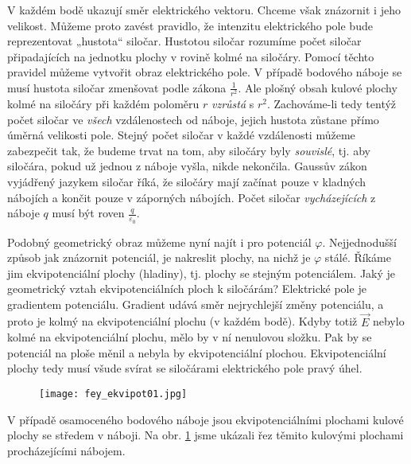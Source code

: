     V každém bodě ukazují směr elektrického vektoru. Chceme však znázornit i jeho velikost. Můžeme 
    proto zavést pravidlo, že intenzitu elektrického pole bude reprezentovat „hustota“ siločar. 
    Hustotou siločar rozumíme počet siločar připadajících na jednotku plochy v rovině kolmé na 
    siločáry. Pomocí těchto pravidel můžeme vytvořit obraz elektrického pole. V případě bodového 
    náboje se musí hustota siločar zmenšovat podle zákona \(\frac{1}{r^2}\). Ale plošný obsah kulové 
    plochy kolmé na siločáry při každém poloměru \(r\) \emph{vzrůstá} s \(r^2\). Zachováme-li tedy 
    tentýž počet siločar ve \emph{všech} vzdálenostech od náboje, jejich hustota zůstane přímo 
    úměrná velikosti pole. Stejný počet siločar v každé vzdálenosti můžeme zabezpečit tak, že budeme 
    trvat na tom, aby siločáry byly \emph{souvislé}, tj. aby siločára, pokud už jednou z náboje 
    vyšla, nikde nekončila. Gaussův zákon vyjádřený jazykem siločar říká, že siločáry mají začínat 
    pouze v kladných nábojích a končit pouze v záporných nábojích. Počet siločar 
    \emph{vycházejících} z náboje \(q\) musí být roven \(\frac{q}{\varepsilon_0}\).
    
    Podobný geometrický obraz můžeme nyní najít i pro potenciál \(\varphi\). Nejjednodušší způsob 
    jak znázornit potenciál, je nakreslit plochy, na nichž je \(\varphi\) stálé. Říkáme jim 
    ekvipotenciální plochy (hladiny), tj. plochy se stejným potenciálem. Jaký je geometrický vztah 
    ekvipotenciálních ploch k siločárám? Elektrické pole je gradientem potenciálu. Gradient udává 
    směr nejrychlejší změny potenciálu, a proto je kolmý na ekvipotenciální plochu (v každém bodě). 
    Kdyby totiž \(\vec{E}\) nebylo kolmé na ekvipotenciální plochu, mělo by v ní nenulovou složku. 
    Pak by se potenciál na ploše měnil a nebyla by ekvipotenciální plochou. Ekvipotenciální plochy 
    tedy musí všude svírat se siločárami elektrického pole pravý úhel.    
    \begin{figure}[ht!]
      \centering
      \texttt{[image: fey\_ekvipot01.jpg]}
      \label{fyz:fig_fey_ekvipot01}  
    \end{figure}
    
    V případě osamoceného bodového náboje jsou ekvipotenciálními plochami kulové plochy se středem v 
    náboji. Na obr. \ref{fyz:fig_fey_ekvipot01} jsme ukázali řez těmito kulovými plochami 
    procházejícími nábojem.
    
